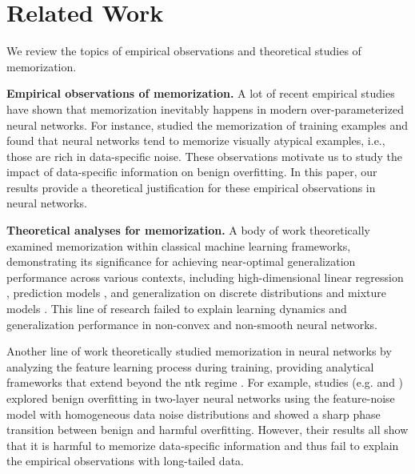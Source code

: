 \section{Related Work}
We review the topics of empirical observations and theoretical studies of memorization.

\textbf{Empirical observations of memorization.}
A lot of recent empirical studies have shown that memorization inevitably happens in modern over-parameterized neural networks.
For instance, \citet{feldman2020neural,garg2023memorization} studied the memorization of training examples and found that neural networks tend to memorize visually atypical examples, i.e., those are rich in data-specific noise. 
These observations motivate us to study the impact of data-specific information on benign overfitting.
In this paper, our results provide a theoretical justification for these empirical observations in neural networks. 

\textbf{Theoretical analyses for memorization.}
A body of work theoretically examined memorization within classical machine learning frameworks, demonstrating its significance for achieving near-optimal generalization performance across various contexts, including high-dimensional linear regression \citep{cheng2022memorize}, prediction models \citep{brown2021memorization}, and generalization on discrete distributions and mixture models \citep{feldman2020does}.
This line of research failed to explain learning dynamics and generalization performance in non-convex and non-smooth neural networks.

Another line of work theoretically studied memorization in neural networks by analyzing the feature learning process during training, providing analytical frameworks that extend beyond the \ac{ntk} regime \citep{jacot2018neural,allen2019convergence,du2018gradient}.
For example, studies (e.g. \cite{cao2022benign} and \cite{kou2023benign}) explored benign overfitting in two-layer neural networks using the feature-noise model with homogeneous data noise distributions and showed a sharp phase transition between benign and harmful overfitting.
However, their results all show that it is harmful to memorize data-specific information and thus fail to explain the empirical observations with long-tailed data.